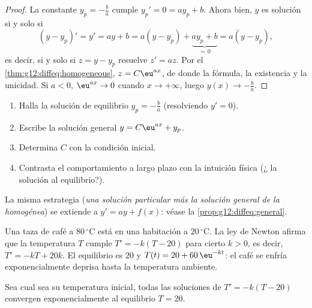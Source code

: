 \begin{proof}
La constante $y_p = -\frac{b}{a}$ cumple $y_p' = 0 = a y_p + b$. Ahora
bien, $y$ es solución si y solo si
\[
(y - y_p)' = y' = ay + b = a(y - y_p) + \underbrace{a y_p + b}_{=\,0}
= a (y - y_p),
\]
es decir, si y solo si $z = y - y_p$ resuelve $z' = az$. Por el
\cref{thm:g12:diffeq:homogeneous}, $z = C\eu^{ax}$, de donde la fórmula, la
existencia y la unicidad. Si $a < 0$, $\eu^{ax} \to 0$ cuando
$x \to +\infty$, luego $y(x) \to -\frac ba$.
\end{proof}

\begin{method}[Resolver $y' = ay + b$ con una condición inicial]\label{met:g12:diffeq:solve}
\begin{enumerate}
  \item Halla la solución de equilibrio $y_p = -\frac{b}{a}$ (resolviendo
        $y' = 0$).
  \item Escribe la solución general $y = C\eu^{ax} + y_p$.
  \item Determina $C$ con la condición inicial.
  \item Contrasta el comportamiento a largo plazo con la intuición física
        (¿ la solución al equilibrio?).
\end{enumerate}
La misma estrategia (\emph{una solución particular más la solución general
de la  homogénea}) se extiende a $y' = ay + f(x)$: véase la
\cref{prop:g12:diffeq:general}.
\end{method}

\begin{example}\label{ex:g12:diffeq:cooling}
Una taza de café a $80\,^\circ$C está en una habitación a $20\,^\circ$C. La
ley de Newton afirma que la temperatura $T$ cumple $T' = -k(T - 20)$ para
cierto $k > 0$, es decir, $T' = -kT + 20k$. El equilibrio es $20$ y
$T(t) = 20 + 60\,\eu^{-kt}$: el café se enfría exponencialmente deprisa
hasta la temperatura ambiente.
\end{example}

\begin{omfigure}

{\small Sea cual sea su temperatura inicial, todas las soluciones de
$T' = -k(T - 20)$ convergen exponencialmente al equilibrio $T = 20$.}
\end{omfigure}

